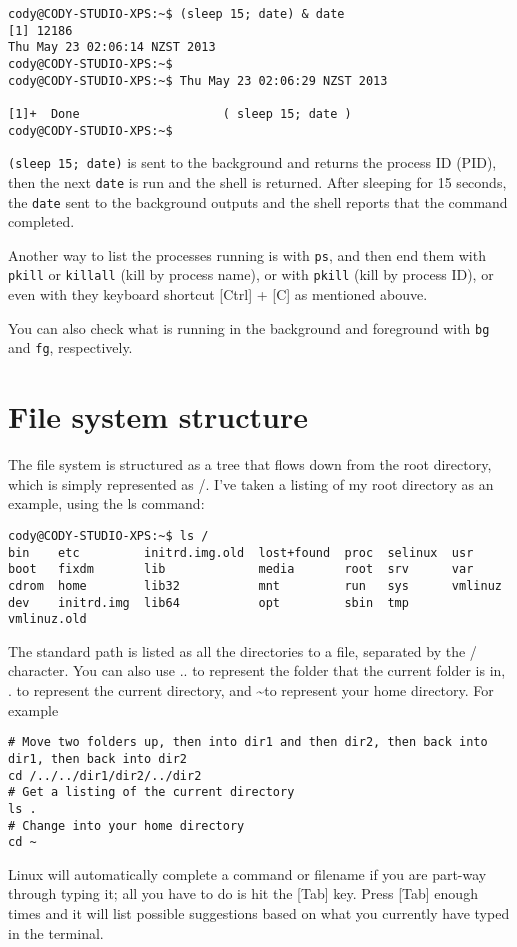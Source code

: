 \documentclass{article}
\begin{document}
\begin{verbatim}
cody@CODY-STUDIO-XPS:~$ (sleep 15; date) & date 
[1] 12186
Thu May 23 02:06:14 NZST 2013
cody@CODY-STUDIO-XPS:~$ 
cody@CODY-STUDIO-XPS:~$ Thu May 23 02:06:29 NZST 2013

[1]+  Done                    ( sleep 15; date )
cody@CODY-STUDIO-XPS:~$ 
\end{verbatim}
\texttt{(sleep 15; date)} is sent to the background and returns the process ID (PID), then the next \texttt{date} is run and the shell is returned. After sleeping for 15 seconds, the \texttt{date} sent to the background outputs and  the shell reports that the command completed.

Another way to list the processes running is with \texttt{ps}, and then end them with \texttt{pkill} or \texttt{killall} (kill by process name), or with \texttt{pkill} (kill by process ID), or even with they keyboard shortcut [Ctrl] + [C] as mentioned abouve.

You can also check what is running in the background and foreground with \texttt{bg} and \texttt{fg}, respectively.
 
\section{File system structure}
The file system is structured as a tree that flows down from the root directory, which is simply represented as /. I've taken a listing of my root directory as an example, using the ls command:
\begin{verbatim}
cody@CODY-STUDIO-XPS:~$ ls /
bin    etc         initrd.img.old  lost+found  proc  selinux  usr
boot   fixdm       lib             media       root  srv      var
cdrom  home        lib32           mnt         run   sys      vmlinuz
dev    initrd.img  lib64           opt         sbin  tmp      vmlinuz.old
\end{verbatim}
The standard path is listed as all the directories to a file, separated by the / character.
You can also use .. to represent the folder that the current folder is in, . to represent the current directory, and \textasciitilde to represent your home directory. For example
\begin{verbatim}
# Move two folders up, then into dir1 and then dir2, then back into dir1, then back into dir2
cd /../../dir1/dir2/../dir2
# Get a listing of the current directory
ls .
# Change into your home directory
cd ~
\end{verbatim}
Linux will automatically complete a command or filename if you are part-way through typing it; all you have to do is hit the [Tab] key. Press [Tab] enough times and it will list possible suggestions based on what you currently have typed in the terminal.
\end{document}
